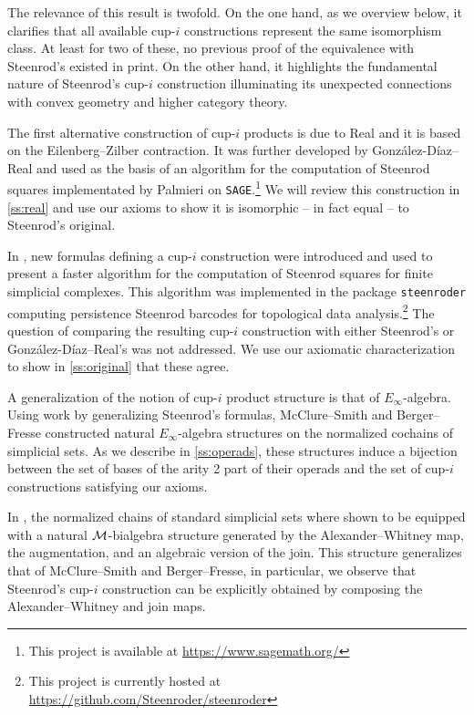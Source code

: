 The relevance of this result is twofold.
On the one hand, as we overview below, it clarifies that all available cup-$i$ constructions represent the same isomorphism class.
At least for two of these, no previous proof of the equivalence with Steenrod's existed in print.
On the other hand, it highlights the fundamental nature of Steenrod's \mbox{cup-$i$} construction illuminating its unexpected connections with convex geometry and higher category theory.

The first alternative construction of \mbox{cup-$i$} products is due to Real \cite{real1996computability} and it is based on the Eilenberg--Zilber contraction.
It was further developed by Gonz\'alez-D\'iaz--Real \cite{gonzalez-diaz1999steenrod} and used as the basis of an algorithm for the computation of Steenrod squares implementated by Palmieri on \texttt{SAGE}.\footnote{This project is available at \url{https://www.sagemath.org/}}
We will review this construction in \cref{ss:real} and use our axioms to show it is isomorphic -- in fact equal -- to Steenrod's original.

In \cite{medina2021fast_sq}, new formulas defining a \mbox{cup-$i$} construction were introduced and used to present a faster algorithm for the computation of Steenrod squares for finite simplicial complexes.
This algorithm was implemented in the package \texttt{steenroder} computing persistence Steenrod barcodes for topological data analysis.\footnote{This project is currently hosted at \url{https://github.com/Steenroder/steenroder}}
The question of comparing the resulting \mbox{cup-$i$} construction with either Steenrod's or Gonz\'alez-D\'iaz--Real's was not addressed.
We use our axiomatic characterization to show in \cref{ss:original} that these agree.

A generalization of the notion of \mbox{cup-$i$} product structure is that of $E_\infty$-algebra.
Using work by \cite[]{benson1998representations} generalizing Steenrod's formulas, McClure--Smith \cite{mcclure2003multivariable} and Berger--Fresse \cite{berger2004combinatorial} constructed natural $E_\infty$-algebra structures on the normalized cochains of simplicial sets.
As we describe in \cref{ss:operads}, these structures induce a bijection between the set of bases of the arity 2 part of their operads and the set of \mbox{cup-$i$} constructions satisfying our axioms.

In \cite{medina2020prop1}, the normalized chains of standard simplicial sets where shown to be equipped with a natural $\mathcal{M}$-bialgebra structure generated by the Alexander--Whitney map, the augmentation, and an algebraic version of the join.
This structure generalizes that of McClure--Smith and Berger--Fresse, in particular, we observe that Steenrod's \mbox{cup-$i$} construction can be explicitly obtained by composing the Alexander--Whitney and join maps.


